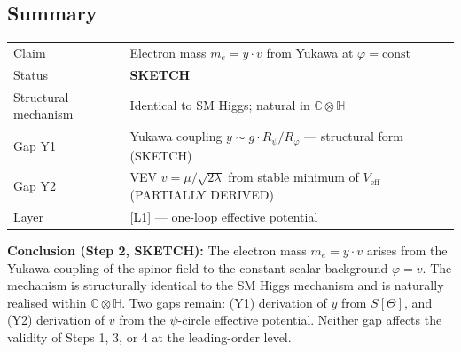 \documentclass[12pt]{article}
\theoremstyle{definition}
\theoremstyle{remark}
\begin{document}
\subsection{Summary}

\begin{center}
\begin{tabular}{ll}
\hline
Claim & Electron mass $m_e = y\cdot v$ from Yukawa at $\varphi = \mathrm{const}$ \\
Status & \textbf{SKETCH} \\
Structural mechanism & Identical to SM Higgs; natural in $\mathbb{C}\otimes\mathbb{H}$ \\
Gap Y1 & Yukawa coupling $y \sim g\cdot R_\psi/R_\varphi$ — structural form (SKETCH) \\
Gap Y2 & VEV $v = \mu/\sqrt{2\lambda}$ from stable minimum of $V_\mathrm{eff}$ (PARTIALLY DERIVED) \\
Layer & [L1] — one-loop effective potential \\
\hline
\end{tabular}
\end{center}

\begin{resultbox}
\textbf{Conclusion (Step 2, SKETCH):}
The electron mass $m_e = y\cdot v$ arises from the Yukawa coupling of the spinor field
to the constant scalar background $\varphi = v$.  The mechanism is structurally identical
to the SM Higgs mechanism and is naturally realised within $\mathbb{C}\otimes\mathbb{H}$.
Two gaps remain: (Y1) derivation of $y$ from $S[\Theta]$, and (Y2) derivation of $v$
from the $\psi$-circle effective potential.  Neither gap affects the validity of Steps 1,
3, or 4 at the leading-order level.
\end{resultbox}

\ifdefined\INCLUDEMODE\else
  
\end{document}
